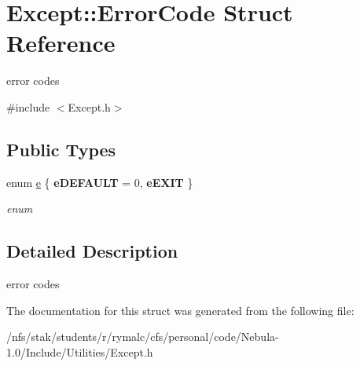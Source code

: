\hypertarget{structExcept_1_1ErrorCode}{
\section{Except::ErrorCode Struct Reference}
\label{structExcept_1_1ErrorCode}
}


error codes  


{\ttfamily \#include $<$Except.h$>$}\subsection*{Public Types}
\begin{DoxyCompactItemize}
\item 
enum \hyperlink{structExcept_1_1ErrorCode_aa2572bcb12de6c0b74158e1bf246f36d}{e} \{ {\bfseries eDEFAULT} =  0, 
{\bfseries eEXIT}
 \}
\begin{DoxyCompactList}\small\item\em enum \item\end{DoxyCompactList}\end{DoxyCompactItemize}


\subsection{Detailed Description}
error codes 

The documentation for this struct was generated from the following file:\begin{DoxyCompactItemize}
\item 
/nfs/stak/students/r/rymalc/cfs/personal/code/Nebula-\/1.0/Include/Utilities/Except.h\end{DoxyCompactItemize}
